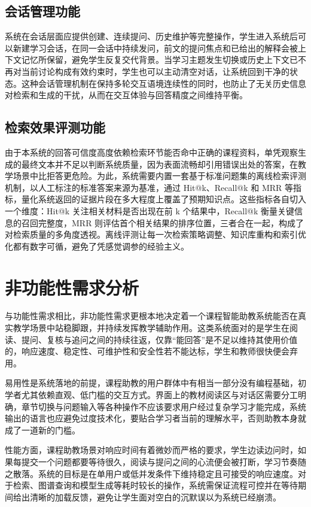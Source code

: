 \subsection{会话管理功能}
系统在会话层面应提供创建、连续提问、历史维护等完整操作，学生进入系统后可以新建学习会话，在同一会话中持续发问，前文的提问焦点和已给出的解释会被上下文记忆所保留，避免学生反复交代背景。当学习主题发生切换或历史上下文已不再对当前讨论构成有效约束时，学生也可以主动清空对话，让系统回到干净的状态。这种会话管理机制在保持多轮交互语境连续性的同时，也防止了无关历史信息对检索和生成的干扰，从而在交互体验与回答精度之间维持平衡。

\subsection{检索效果评测功能}
由于本系统的回答可信度高度依赖检索环节能否命中正确的课程资料，单凭观察生成的最终文本并不足以判断系统质量，因为表面流畅却引用错误出处的答案，在教学场景中比拒答更危险。为此，系统需要内置一套基于标准问题集的离线检索评测机制，以人工标注的标准答案来源为基准，通过 Hit@k、Recall@k 和 MRR 等指标，量化系统返回的证据片段在多大程度上覆盖了预期知识点。这些指标各自切入一个维度：Hit@k 关注相关材料是否出现在前 k 个结果中，Recall@k 衡量关键信息的召回完整度，MRR 则评估首个相关结果的排序位置，三者合在一起，构成了对检索质量的多角度透视。离线评测让每一次检索策略调整、知识库重构和索引优化都有数字可循，避免了凭感觉调参的经验主义。

\section{非功能性需求分析}
与功能性需求相比，非功能性需求更根本地决定着一个课程智能助教系统能否在真实教学场景中站稳脚跟，并持续发挥教学辅助作用。这类系统面对的是学生在阅读、提问、复核与追问之间的持续往返，仅靠“能回答”是不足以维持其使用价值的，响应速度、稳定性、可维护性和安全性若不能达标，学生和教师很快便会弃用。

易用性是系统落地的前提，课程助教的用户群体中有相当一部分没有编程基础，初学者尤其依赖直观、低门槛的交互方式。界面上的教材阅读区与对话区需要分工明确，章节切换与问题输入等各种操作不应该要求用户经过复杂学习才能完成，系统输出的语言也应避免过度技术化，要贴合学习者当前的理解水平，否则助教本身就成了一道新的门槛。

性能方面，课程助教场景对响应时间有着微妙而严格的要求，学生边读边问时，如果每提交一个问题都要等待很久，阅读与提问之间的心流便会被打断，学习节奏随之散落。系统的目标是在单用户或低并发条件下维持稳定且可接受的响应速度。对于检索、图谱查询和模型生成等耗时较长的操作，系统需保证流程可控并在等待期间给出清晰的加载反馈，避免让学生面对空白的沉默误以为系统已经崩溃。

